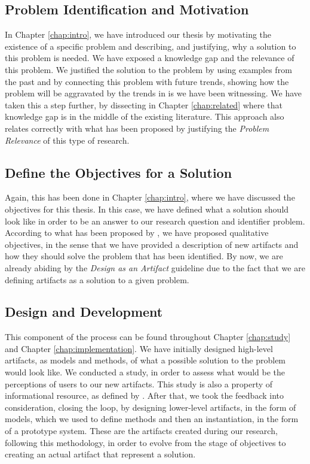 \subsection{Problem Identification and Motivation}

In Chapter \ref{chap:intro}, we have introduced our thesis by motivating the existence of a specific problem and describing, and justifying, why a solution to this problem is needed. We have exposed a knowledge gap and the relevance of this problem. We justified the solution to the problem by using examples from the past and by connecting this problem with future trends, showing how the problem will be aggravated by the trends in \gls{is} we have been witnessing. We have taken this a step further, by dissecting in Chapter \ref{chap:related} where that knowledge gap is in the middle of the existing literature. This approach also relates correctly with what has been proposed \citeauthor{hevner_design_2004} by justifying the \textit{Problem Relevance} of this type of research.

\subsection{Define the Objectives for a Solution}

Again, this has been done in Chapter \ref{chap:intro}, where we have discussed the objectives for this thesis. In this case, we have defined what a solution should look like in order to be an answer to our research question and identifier problem. According to what has been proposed by \citeauthor{peffers_design_2007}, we have proposed qualitative objectives, in the sense that we have provided a description of new artifacts and how they should solve the problem that has been identified. By now, we are already abiding by the \textit{Design as an Artifact} guideline \cite{hevner_design_2004} due to the fact that we are defining artifacts as a solution to a given problem.

\subsection{Design and Development}

This component of the process can be found throughout Chapter \ref{chap:study} and Chapter \ref{chap:implementation}. We have initially designed high-level artifacts, as models and methods, of what a possible solution to the problem would look like. We conducted a study, in order to assess what would be the perceptions of users to our new artifacts. This study is also a property of informational resource, as defined by \citeauthor{peffers_design_2007}. After that, we took the feedback into consideration, closing the loop, by designing lower-level artifacts, in the form of models, which we used to define methods and then an instantiation, in the form of a prototype system. These are the artifacts created during our research, following this methodology, in order to evolve from the stage of objectives to creating an actual artifact that represent a solution.

